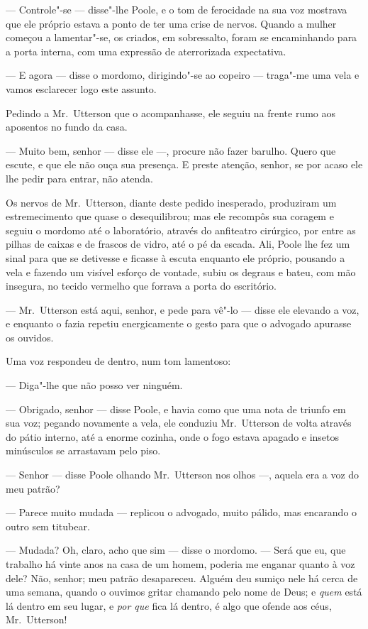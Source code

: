 --- Controle"-se --- disse"-lhe Poole, e o tom de ferocidade na sua voz
mostrava que ele próprio estava a ponto de ter uma crise de nervos. 
Quando a mulher começou a lamentar"-se, os criados, em sobressalto,
foram se encaminhando para a porta interna, com uma expressão de
aterrorizada expectativa. 

--- E agora --- disse o mordomo, dirigindo"-se ao copeiro --- traga"-me uma
vela e vamos esclarecer logo este assunto.

Pedindo a Mr.~Utterson que o acompanhasse, ele seguiu na frente rumo aos
aposentos no fundo da casa.

--- Muito bem, senhor --- disse ele ---, procure não fazer barulho.  Quero
que escute, e que ele não ouça sua presença.  E preste atenção, senhor,
se por acaso ele lhe pedir para entrar, não atenda.

Os nervos de Mr.~Utterson, diante deste pedido inesperado, produziram um
estremecimento que quase o desequilibrou; mas ele recompôs sua coragem
e seguiu o mordomo até o laboratório, através do anfiteatro cirúrgico,
por entre as pilhas de caixas e de frascos de vidro, até o pé da
escada.  Ali, Poole lhe fez um sinal para que se detivesse e ficasse à
escuta enquanto ele próprio, pousando a vela e fazendo um visível
esforço de vontade, subiu os degraus e bateu, com mão insegura, no
tecido vermelho que forrava a porta do escritório.

--- Mr.~Utterson está aqui, senhor, e pede para vê"-lo --- disse ele
elevando a voz, e enquanto o fazia repetiu energicamente o gesto para
que o advogado apurasse os ouvidos.

Uma voz respondeu de dentro, num tom lamentoso:

--- Diga"-lhe que não posso ver ninguém.

--- Obrigado, senhor --- disse Poole, e havia como que uma nota de triunfo
em sua voz; pegando novamente a vela, ele conduziu Mr.~Utterson de
volta através do pátio interno, até a enorme cozinha, onde o fogo
estava apagado e insetos minúsculos se arrastavam pelo piso. 

--- Senhor --- disse Poole olhando Mr.~Utterson nos olhos ---, aquela era a
voz do meu patrão?

--- Parece muito mudada --- replicou o advogado, muito pálido, mas
encarando o outro sem titubear.

--- Mudada? Oh, claro, acho que sim --- disse o mordomo. --- Será que eu,
que trabalho há vinte anos na casa de um homem, poderia me enganar
quanto à voz dele?  Não, senhor; meu patrão desapareceu. Alguém deu
sumiço nele há cerca de uma semana, quando o ouvimos gritar chamando
pelo nome de Deus; e \textit{quem} está lá dentro em seu lugar, e
\textit{por que }fica lá dentro, é algo que ofende aos céus, Mr.~Utterson!

